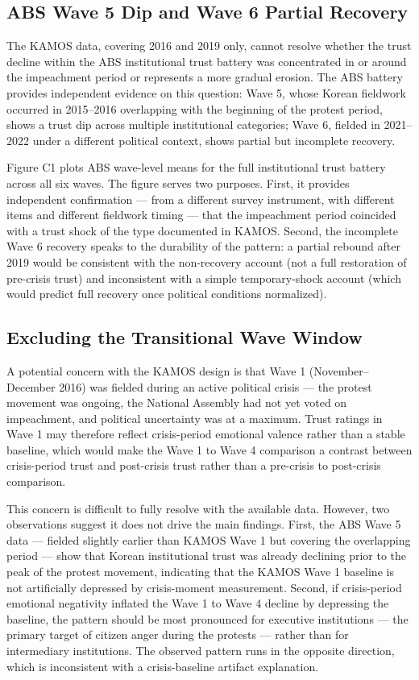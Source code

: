 \documentclass[
  12pt,
  letterpaper]{article}
\begin{document}
\subsection{ABS Wave 5 Dip and Wave 6 Partial
Recovery}\label{sec-abs-robustness}

The KAMOS data, covering 2016 and 2019 only, cannot resolve whether the
trust decline within the ABS institutional trust battery was
concentrated in or around the impeachment period or represents a more
gradual erosion. The ABS battery provides independent evidence on this
question: Wave 5, whose Korean fieldwork occurred in 2015--2016
overlapping with the beginning of the protest period, shows a trust dip
across multiple institutional categories; Wave 6, fielded in 2021--2022
under a different political context, shows partial but incomplete
recovery.

Figure C1 plots ABS wave-level means for the full institutional trust
battery across all six waves. The figure serves two purposes. First, it
provides independent confirmation --- from a different survey
instrument, with different items and different fieldwork timing --- that
the impeachment period coincided with a trust shock of the type
documented in KAMOS. Second, the incomplete Wave 6 recovery speaks to
the durability of the pattern: a partial rebound after 2019 would be
consistent with the non-recovery account (not a full restoration of
pre-crisis trust) and inconsistent with a simple temporary-shock account
(which would predict full recovery once political conditions
normalized).

\subsection{Excluding the Transitional Wave
Window}\label{sec-wave-window}

A potential concern with the KAMOS design is that Wave 1
(November--December 2016) was fielded during an active political crisis
--- the protest movement was ongoing, the National Assembly had not yet
voted on impeachment, and political uncertainty was at a maximum. Trust
ratings in Wave 1 may therefore reflect crisis-period emotional valence
rather than a stable baseline, which would make the Wave 1 to Wave 4
comparison a contrast between crisis-period trust and post-crisis trust
rather than a pre-crisis to post-crisis comparison.

This concern is difficult to fully resolve with the available data.
However, two observations suggest it does not drive the main findings.
First, the ABS Wave 5 data --- fielded slightly earlier than KAMOS Wave
1 but covering the overlapping period --- show that Korean institutional
trust was already declining prior to the peak of the protest movement,
indicating that the KAMOS Wave 1 baseline is not artificially depressed
by crisis-moment measurement. Second, if crisis-period emotional
negativity inflated the Wave 1 to Wave 4 decline by depressing the
baseline, the pattern should be most pronounced for executive
institutions --- the primary target of citizen anger during the protests
--- rather than for intermediary institutions. The observed pattern runs
in the opposite direction, which is inconsistent with a crisis-baseline
artifact explanation.
\end{document}
